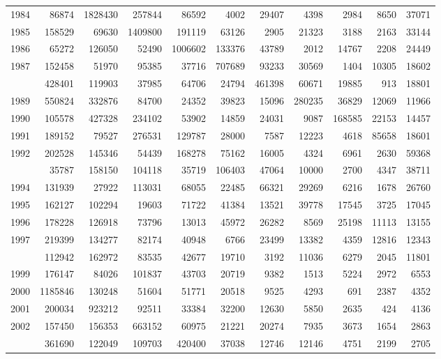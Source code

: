 \documentclass[
]{article}
\begin{document}
\begin{longtable}[t]{lrrrrrrrrrr}
1984 & 86874 & 1828430 & 257844 & 86592 & 4002 & 29407 & 4398 & 2984 & 8650 & 37071\\
1985 & 158529 & 69630 & 1409800 & 191119 & 63126 & 2905 & 21323 & 3188 & 2163 & 33144\\
1986 & 65272 & 126050 & 52490 & 1006602 & 133376 & 43789 & 2012 & 14767 & 2208 & 24449\\
1987 & 152458 & 51970 & 95385 & 37716 & 707689 & 93233 & 30569 & 1404 & 10305 & 18602\\
\addlinespace
1988 & 428401 & 119903 & 37985 & 64706 & 24794 & 461398 & 60671 & 19885 & 913 & 18801\\
1989 & 550824 & 332876 & 84700 & 24352 & 39823 & 15096 & 280235 & 36829 & 12069 & 11966\\
1990 & 105578 & 427328 & 234102 & 53902 & 14859 & 24031 & 9087 & 168585 & 22153 & 14457\\
1991 & 189152 & 79527 & 276531 & 129787 & 28000 & 7587 & 12223 & 4618 & 85658 & 18601\\
1992 & 202528 & 145346 & 54439 & 168278 & 75162 & 16005 & 4324 & 6961 & 2630 & 59368\\
\addlinespace
1993 & 35787 & 158150 & 104118 & 35719 & 106403 & 47064 & 10000 & 2700 & 4347 & 38711\\
1994 & 131939 & 27922 & 113031 & 68055 & 22485 & 66321 & 29269 & 6216 & 1678 & 26760\\
1995 & 162127 & 102294 & 19603 & 71722 & 41384 & 13521 & 39778 & 17545 & 3725 & 17045\\
1996 & 178228 & 126918 & 73796 & 13013 & 45972 & 26282 & 8569 & 25198 & 11113 & 13155\\
1997 & 219399 & 134277 & 82174 & 40948 & 6766 & 23499 & 13382 & 4359 & 12816 & 12343\\
\addlinespace
1998 & 112942 & 162972 & 83535 & 42677 & 19710 & 3192 & 11036 & 6279 & 2045 & 11801\\
1999 & 176147 & 84026 & 101837 & 43703 & 20719 & 9382 & 1513 & 5224 & 2972 & 6553\\
2000 & 1185846 & 130248 & 51604 & 51771 & 20518 & 9525 & 4293 & 691 & 2387 & 4352\\
2001 & 200034 & 923212 & 92511 & 33384 & 32200 & 12630 & 5850 & 2635 & 424 & 4136\\
2002 & 157450 & 156353 & 663152 & 60975 & 21221 & 20274 & 7935 & 3673 & 1654 & 2863\\
\addlinespace
2003 & 361690 & 122049 & 109703 & 420400 & 37038 & 12746 & 12146 & 4751 & 2199 & 2705\\

\end{longtable}
\end{document}
